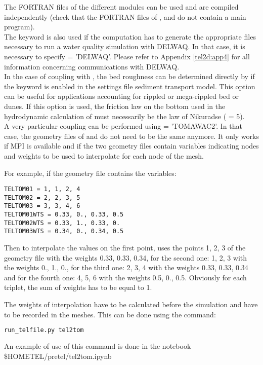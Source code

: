 The FORTRAN files of the different modules can be used and are compiled
independently (check that the FORTRAN files of \gaia, \tomawac and \khione do
not contain a main program).\\

The keyword  is also used if the computation
has to generate the appropriate files necessary to run a water quality
simulation with DELWAQ.
In that case, it is necessary to specify  = 'DELWAQ'.
Please refer to Appendix \ref{tel2d:app4} for all information concerning
communications with DELWAQ.\\

In the case of coupling  with \gaia, the bed roughness can be
determined directly by \gaia if the keyword
 is enabled in the settings
file sediment transport model. This option can be useful for applications
accounting for rippled or mega-rippled bed or dunes.
If this option is used, the friction law on the bottom used
in the hydrodynamic calculation of  must necessarily be
the law of Nikuradse ( = 5).\\

A very particular coupling can be performed using  =
'TOMAWAC2'.
In that case, the geometry files of  and \tomawac do not need
to be the same anymore.
It only works if MPI is available and if the two geometry files contain
variables indicating nodes and weights to be used to interpolate for each node
of the mesh.

For example, if the \tomawac geometry file contains the variables:

\begin{lstlisting}
TELTOM01 = 1, 1, 2, 4
TELTOM02 = 2, 2, 3, 5
TELTOM03 = 3, 3, 4, 6
TELTOM01WTS = 0.33, 0., 0.33, 0.5
TELTOM02WTS = 0.33, 1., 0.33, 0.
TELTOM03WTS = 0.34, 0., 0.34, 0.5
\end{lstlisting}

Then to interpolate the values on the first point,
\tomawac uses the points 1, 2, 3 of the  geometry file with the
weights 0.33, 0.33, 0.34,
for the second one: 1, 2, 3 with the weights 0., 1., 0.,
for the third one: 2, 3, 4 with the weights 0.33, 0.33, 0.34
and for the fourth one: 4, 5, 6 with the weights 0.5, 0., 0.5.
Obviously for each triplet, the sum of weights has to be equal to 1.

The weights of interpolation have to be calculated before the simulation and
have to be recorded in the meshes.
This can be done using the command:
\begin{lstlisting}[language=bash]
run_telfile.py tel2tom
\end{lstlisting}
An example of use of this command is done in the notebook
\$HOMETEL/pretel/tel2tom.ipynb

